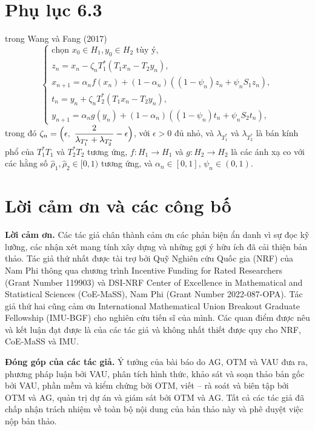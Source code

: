 \documentclass{MyBook}
\theoremstyle{plain}
\theoremstyle{definition}
\theoremstyle{remark}
\numberwithin{equation}{chapter}
\begin{document}
\chapter*{Phụ lục 6.3}

trong Wang và Fang (2017)
\[
\begin{cases}
\text{chọn } x_0\in H_1, y_0\in H_2 \text{ tùy ý},\\
z_n=x_n-\zeta_n T_1^{*}(T_1x_n-T_2y_n),\\
x_{n+1}=\alpha_n f(x_n)+(1-\alpha_n)((1-\psi_n)z_n+\psi_n S_1z_n),\\
t_n=y_n+\zeta_n T_2^{*}(T_1x_n-T_2y_n),\\
y_{n+1}=\alpha_n g(y_n)+(1-\alpha_n)((1-\psi_n)t_n+\psi_n S_2t_n),
\end{cases}
\]
trong đó $\zeta_n=\Bigl(\epsilon,\ \dfrac{2}{\lambda_{T_1^{*}}+\lambda_{T_2^{*}}}-\epsilon\Bigr)$, với $\epsilon>0$ đủ nhỏ, và $\lambda_{T_1^{*}}$ và $\lambda_{T_2^{*}}$ là bán kính phổ của $T_1^{*}T_1$ và $T_2^{*}T_2$ tương ứng, $f:H_1\to H_1$ và $g:H_2\to H_2$ là các ánh xạ co với các hằng số $\hat{\rho}_1,\hat{\rho}_2\in[0,1)$ tương ứng, và $\alpha_n\in[0,1]$, $\psi_n\in(0,1)$.

\chapter*{Lời cảm ơn và các công bố}

\noindent\textbf{Lời cảm ơn.} Các tác giả chân thành cảm ơn các phản biện ẩn danh vì sự đọc kỹ lưỡng, các nhận xét mang tính xây dựng và những gợi ý hữu ích đã cải thiện bản thảo. Tác giả thứ nhất được tài trợ bởi Quỹ Nghiên cứu Quốc gia (NRF) của Nam Phi thông qua chương trình Incentive Funding for Rated Researchers (Grant Number 119903) và DSI-NRF Center of Excellence in Mathematical and Statistical Sciences (CoE-MaSS), Nam Phi (Grant Number 2022-087-OPA). Tác giả thứ hai cũng cảm ơn International Mathematical Union Breakout Graduate Fellowship (IMU-BGF) cho nghiên cứu tiến sĩ của mình. Các quan điểm được nêu và kết luận đạt được là của các tác giả và không nhất thiết được quy cho NRF, CoE-MaSS và IMU.

\medskip
\noindent\textbf{Đóng góp của các tác giả.} Ý tưởng của bài báo do AG, OTM và VAU đưa ra, phương pháp luận bởi VAU, phân tích hình thức, khảo sát và soạn thảo bản gốc bởi VAU, phần mềm và kiểm chứng bởi OTM, viết -- rà soát và biên tập bởi OTM và AG, quản trị dự án và giám sát bởi OTM và AG. Tất cả các tác giả đã chấp nhận trách nhiệm về toàn bộ nội dung của bản thảo này và phê duyệt việc nộp bản thảo.
\end{document}
